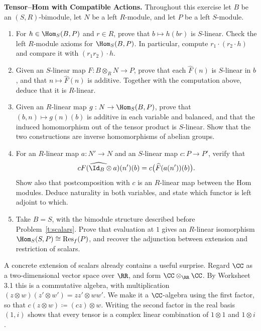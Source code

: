 \documentclass[12pt,reqno]{amsart}
\DeclareMathOperator{\Res}{Res}
\begin{document}
\hrulefill

\begin{problems}
\item\label{t:adjunction} \textbf{Tensor--Hom with Compatible Actions.} Throughout this exercise let $B$ be an $(S,R)$-bimodule, let $N$ be a left $R$-module, and let $P$ be a left $S$-module.
\begin{enumerate}
\item For $h\in\Hom_S(B,P)$ and $r\in R$, prove that $b\mapsto h(br)$ is $S$-linear. Check the left $R$-module axioms for $\Hom_S(B,P)$. In particular, compute $r_1\cdot(r_2\cdot h)$ and compare it with $(r_1r_2)\cdot h$.
\item Given an $S$-linear map $F:B\otimes_RN\to P$, prove that each $\widehat F(n)$ is $S$-linear in $b$, and that $n\mapsto\widehat F(n)$ is additive. Together with the computation above, deduce that it is $R$-linear.
\item Given an $R$-linear map $g:N\to\Hom_S(B,P)$, prove that $(b,n)\mapsto g(n)(b)$ is additive in each variable and balanced, and that the induced homomorphism out of the tensor product is $S$-linear. Show that the two constructions are inverse homomorphisms of abelian groups.
\item For an $R$-linear map $a:N'\to N$ and an $S$-linear map $c:P\to P'$, verify that
\[
\widehat{cF(\Id_B\otimes a)}(n')(b)=c\bigl(\widehat F(a(n'))(b)\bigr).
\]
Show also that postcomposition with $c$ is an $R$-linear map between the Hom modules. Deduce naturality in both variables, and state which functor is left adjoint to which.
\item Take $B=S$, with the bimodule structure described before Problem~\ref{t:scalars}. Prove that evaluation at $1$ gives an $R$-linear isomorphism $\Hom_S(S,P)\cong\Res_f(P)$, and recover the adjunction between extension and restriction of scalars.
\end{enumerate}
\end{problems}

\hrulefill

A concrete extension of scalars already contains a useful surprise. Regard $\CC$ as a two-dimensional vector space over $\RR$, and form $\CC\otimes_{\RR}\CC$. By Worksheet 3.1 this is a commutative algebra, with multiplication $(z\otimes w)(z'\otimes w')=zz'\otimes ww'$. We make it a $\CC$-algebra using the first factor, so that $c(z\otimes w)\coloneqq(cz)\otimes w$. Writing the second factor in the real basis $(1,i)$ shows that every tensor is a complex linear combination of $1\otimes1$ and $1\otimes i$.
\end{document}
